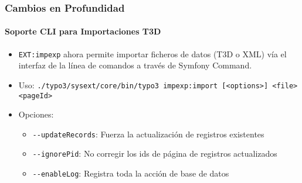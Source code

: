 \begin{frame}[fragile]
	\frametitle{Cambios en Profundidad}
	\framesubtitle{Soporte CLI para Importaciones T3D}

	\begin{itemize}
		\item \texttt{EXT:impexp} ahora permite importar ficheros de datos (T3D o XML) vía el interfaz de la línea
			de comandos a través de Symfony Command.

		\item Uso:\newline
			\smaller
				\texttt{./typo3/sysext/core/bin/typo3 impexp:import [<options>] <file> <pageId>}
			\normalsize

		\item Opciones:
			\begin{itemize}
				\item \texttt{-}\texttt{-updateRecords}: Fuerza la actualización de registros existentes
				\item \texttt{-}\texttt{-ignorePid}: No corregir los ids de página de registros actualizados
				\item \texttt{-}\texttt{-enableLog}: Registra toda la acción de base de datos
			\end{itemize}

	\end{itemize}

\end{frame}


